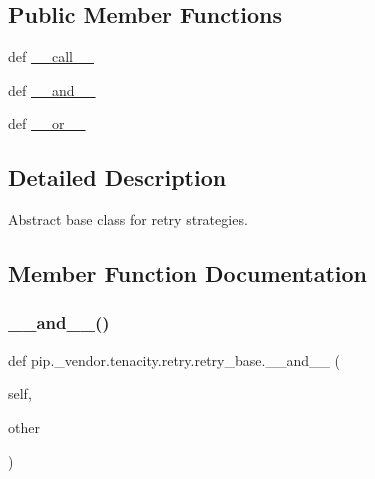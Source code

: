 \subsection*{Public Member Functions}
\begin{DoxyCompactItemize}
\item 
def \hyperlink{classpip_1_1__vendor_1_1tenacity_1_1retry_1_1retry__base_a6c56e1ea169e1199b6a9f76c13edb1e4}{\+\_\+\+\_\+call\+\_\+\+\_\+}
\item 
def \hyperlink{classpip_1_1__vendor_1_1tenacity_1_1retry_1_1retry__base_a2eba249bed6b1f3948eadf84274f2fc8}{\+\_\+\+\_\+and\+\_\+\+\_\+}
\item 
def \hyperlink{classpip_1_1__vendor_1_1tenacity_1_1retry_1_1retry__base_a54ad57a7b2bdd20976ddc8bdd859c2c8}{\+\_\+\+\_\+or\+\_\+\+\_\+}
\end{DoxyCompactItemize}


\subsection{Detailed Description}
\begin{DoxyVerb}Abstract base class for retry strategies.\end{DoxyVerb}
 

\subsection{Member Function Documentation}
\mbox{\label{classpip_1_1__vendor_1_1tenacity_1_1retry_1_1retry__base_a2eba249bed6b1f3948eadf84274f2fc8}} 
\subsubsection{\texorpdfstring{\+\_\+\+\_\+and\+\_\+\+\_\+()}{\_\_and\_\_()}}
{\footnotesize\ttfamily def pip.\+\_\+vendor.\+tenacity.\+retry.\+retry\+\_\+base.\+\_\+\+\_\+and\+\_\+\+\_\+ (\begin{DoxyParamCaption}\item[{}]{self,  }\item[{}]{other }\end{DoxyParamCaption})}


